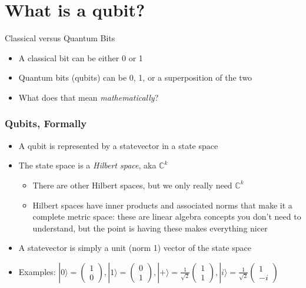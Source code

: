 \documentclass[aspectratio=169]{beamer}
\newcommand{\twovec}[2]{\begin{pmatrix} #1 \\ #2 \end{pmatrix}}
\begin{document}
\section{What is a qubit?}
\frame{\sectionpage}

\begin{frame}{Classical versus Quantum Bits}
    \begin{itemize}
        \item A classical bit can be either 0 or 1
        \item Quantum bits (qubits) can be 0, 1, or a superposition of the two \pause
        \item What does that mean \textit{mathematically}?
    \end{itemize}
\end{frame}

\begin{frame}
  \frametitle{Qubits, Formally}
  \begin{itemize}
      \item A qubit is represented by a \textcolor{sigma@mainblue}{statevector} in a \textcolor{sigma@mainblue}{state space} \pause
      \item The state space is a \textit{Hilbert space}, aka $\mathbb{C}^k$ \pause
      \begin{itemize}
          \item There are other Hilbert spaces, but we only really need $\mathbb{C}^k$
          \item Hilbert spaces have inner products and associated norms that make it a complete metric space: these are linear algebra concepts you don't need to understand, but the point is having these makes everything nicer
      \end{itemize} \pause
      \item A statevector is simply a unit (norm 1) vector of the state space \pause
      \item Examples: $|0 \rangle = \twovec{1}{0}, |1\rangle = \twovec{0}{1}, |+\rangle = \frac{1}{\sqrt{2}}\twovec{1}{1}, |i\rangle = \frac{1}{\sqrt{2}}\twovec{1}{-i}$
  \end{itemize}
\end{frame}
\end{document}
